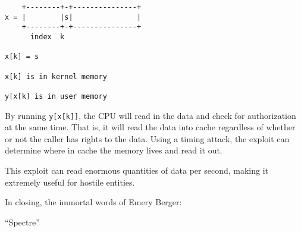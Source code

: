 \documentclass[twoside]{article}
\begin{document}
\begin{lstlisting}
    +--------+-+---------------+
x = |        |s|               |
    +--------+-+---------------+
      index  k

x[k] = s

x[k] is in kernel memory

y[x[k] is in user memory
\end{lstlisting}

By running \texttt{y[x[k]]}, the CPU will read in the data and check for authorization at the same time. That is, it will read the data into cache regardless of whether or not the caller has rights to the data. Using a timing attack, the exploit can determine where in cache the memory lives and read it out.

This exploit can read enormous quantities of data per second, making it extremely useful for hostile entities.

In closing, the immortal words of Emery Berger:

``Spectre''
\end{document}

